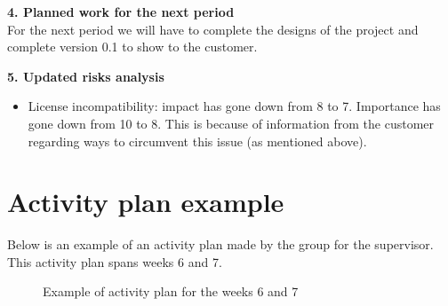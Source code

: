 \textbf{4. Planned work for the next period}\\
For the next period we will have to complete the designs of the project and complete version 0.1 to show to the customer.\\
\newline

\textbf{5. Updated risks analysis}\\
\begin{itemize}
	\item{License incompatibility: impact has gone down from 8 to 7. Importance has gone down from 10 to 8. This is because of information from the customer regarding ways to circumvent this issue (as mentioned above).}
\end{itemize}

\section{Activity plan example}
Below is an example of an activity plan made by the group for the supervisor. This activity plan spans weeks 6 and 7.\\

\begin{figure}[H]
\caption{Example of activity plan for the weeks 6 and 7}
\end{figure}
